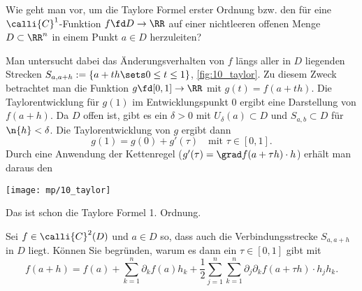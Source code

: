 \begin{frage}
  Wie geht man vor, um die Taylor\sch e Formel erster 
  Ordnung bzw. den  für 
  eine $\calli{C}^1$-Funktion 
  $f \fd D\to \RR$ auf einer nichtleeren offenen Menge 
  $D\subset\RR^n$ in einem Punkt $a\in D$ herzuleiten?
\end{frage}


\begin{antwort}
  Man untersucht dabei das  
  Änderungsverhalten von $f$ längs aller in $D$ liegenden 
  Strecken $S_{a,a+h} := \{ a+th \sets 0 \le t \le 1 \}$, \sieheAbbildung\ref{fig:10_taylor}.  
  Zu diesem Zweck betrachtet man die Funktion $g\fd [0,1]\to\RR$ mit $g(t)=f(a+th)$. 
  Die Taylorentwicklung für $g(1)$ im Entwicklungspunkt $0$ ergibt eine Darstellung  
  von $f(a+h)$. Da $D$ offen ist, gibt es ein $\delta>0$ mit 
  $U_\delta (a) \subset D$ und $S_{a,b} \subset D$ 
  für $\n{ h } < \delta$. Die Taylorentwicklung von $g$ ergibt dann 
  \[
  g(1) = g(0) + g'(\tau) \quad\text{mit $\tau \in [0,1]$}.
  \]
  Durch eine Anwendung der Kettenregel \big($g'(\tau) = \grad f(a+\tau h)\cdot h$\big) erhält man 
  daraus den  

  \begin{center}
    \texttt{[image: mp/10\_taylor]}
    \label{fig:10_taylor}
  \end{center}
  Das ist schon die Taylor\sch e Formel 1. Ordnung. \AntEnd
\end{antwort}

\begin{frage}\label{10_taylor}
  Sei $f\in \calli{C}^2(D)$ und $a\in D$ so, dass auch die 
  Verbindungsstrecke $S_{a,a+h}$ in $D$ liegt. Können Sie begründen, warum 
  es dann ein $\tau\in [0,1]$ gibt mit 
  \[
  f(a+h)=f(a)+ \sum_{k=1}^n \partial_k f(a) h_k + 
  \frac{1}{2} \sum_{j=1}^n \sum_{k=1}^n \partial_j \partial_k 
  f( a+ \tau h )\cdot h_j h_k.
  \]
\end{frage}

